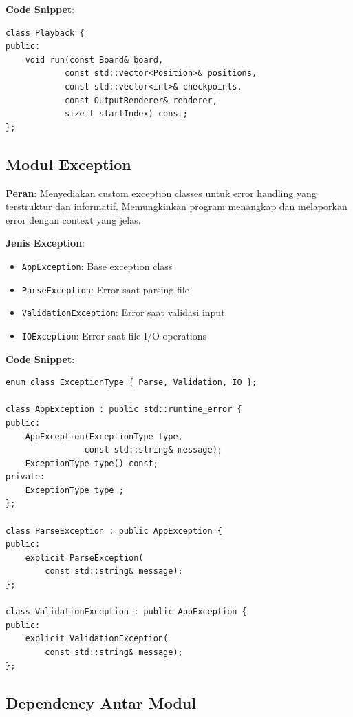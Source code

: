 \textbf{Code Snippet}:
\begin{tcolorbox}[colback=blue!5, title=Playback Class Header]
    \begin{verbatim}
class Playback {
public:
    void run(const Board& board,
            const std::vector<Position>& positions,
            const std::vector<int>& checkpoints,
            const OutputRenderer& renderer,
            size_t startIndex) const;
};
\end{verbatim}
\end{tcolorbox}

\subsection{Modul Exception}

\textbf{Peran}: Menyediakan custom exception classes untuk error handling yang terstruktur dan informatif. Memungkinkan program menangkap dan melaporkan error dengan context yang jelas.

\textbf{Jenis Exception}:
\begin{itemize}
    \item \texttt{AppException}: Base exception class
    \item \texttt{ParseException}: Error saat parsing file
    \item \texttt{ValidationException}: Error saat validasi input
    \item \texttt{IOException}: Error saat file I/O operations
\end{itemize}

\textbf{Code Snippet}:
\begin{tcolorbox}[colback=blue!5, title=Exception Classes Header]
    \begin{verbatim}
enum class ExceptionType { Parse, Validation, IO };

class AppException : public std::runtime_error {
public:
    AppException(ExceptionType type,
                const std::string& message);
    ExceptionType type() const;
private:
    ExceptionType type_;
};

class ParseException : public AppException {
public:
    explicit ParseException(
        const std::string& message);
};

class ValidationException : public AppException {
public:
    explicit ValidationException(
        const std::string& message);
};
\end{verbatim}
\end{tcolorbox}

\subsection{Dependency Antar Modul}

